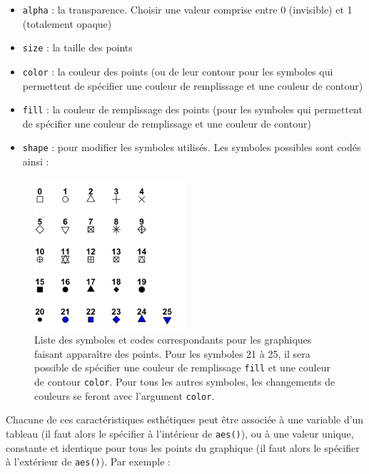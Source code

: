 \documentclass[
  letterpaper,
  DIV=11,
  numbers=noendperiod]{scrreprt}
\providecommand{\tightlist}{%
  \setlength{\itemsep}{0pt}\setlength{\parskip}{0pt}}\usepackage{longtable,booktabs,array}
\begin{document}
\begin{itemize}
\tightlist
\item
  \texttt{alpha} : la transparence. Choisir une valeur comprise entre 0
  (invisible) et 1 (totalement opaque)
\item
  \texttt{size} : la taille des points
\item
  \texttt{color} : la couleur des points (ou de leur contour pour les
  symboles qui permettent de spécifier une couleur de remplissage et une
  couleur de contour)
\item
  \texttt{fill} : la couleur de remplissage des points (pour les
  symboles qui permettent de spécifier une couleur de remplissage et une
  couleur de contour)
\item
  \texttt{shape} : pour modifier les symboles utilisés. Les symboles
  possibles sont codés ainsi :
\end{itemize}

\begin{figure}

{\centering \includegraphics[width=0.5\textwidth,height=\textheight]{./images/pch.png}

}

\caption{\label{fig-pch}Liste des symboles et codes correspondants pour
les graphiques faisant apparaître des points. Pour les symboles 21 à 25,
il sera possible de spécifier une couleur de remplissage \texttt{fill}
et une couleur de contour \texttt{color}. Pour tous les autres symboles,
les changements de couleurs se feront avec l'argument \texttt{color}.}

\end{figure}

Chacune de ces caractéristiques esthétiques peut être associée à une
variable d'un tableau (il faut alors le spécifier à l'intérieur de
\texttt{aes()}), ou à une valeur unique, constante et identique pour
tous les points du graphique (il faut alors le spécifier à l'extérieur
de \texttt{aes()}). Par exemple :
\end{document}
